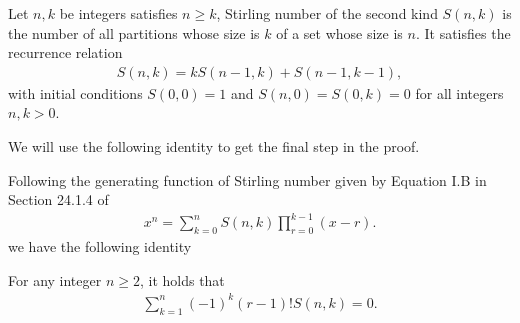 \documentclass[letterpaper,11pt]{article}
\newcommand{\uset}{\calU}
\newcommand{\usetp}[2]{\uset(#1,#2)}
\newcommand{\vset}{\calV}
\newcommand{\vsetp}[2]{\vset(#1,#2)}
\newcommand{\ustat}{\mathbb{U}}
\newcommand{\vstat}{\mathbb{V}}
\newcommand{\partition}{\mathrm{Partition}}
\newcommand{\partitionp}[1]{\partition(#1)}
\newcommand{\pgreater}{\succ}
\begin{document}





\begin{definition}
\label{def:stirling_number}
    Let $n,k$ be integers satisfies $n \geq k$, Stirling number of the second kind $S(n, k)$ is the number of all partitions whose size is $k$ of a set whose size is $n$. It satisfies the recurrence relation 
    \begin{align*}
        S(n, k) = k S(n-1, k) + S(n-1, k-1),
    \end{align*}
    with initial conditions $S(0, 0) = 1$ and $S(n, 0) = S(0, k) = 0$ for all integers $n, k > 0$.
\end{definition}

We will use the following identity to get the final step in the proof. 

Following the generating function of Stirling number given by Equation I.B in Section 24.1.4 of \cite{abramowitz1948handbook}
\begin{align*}
    x^n = \sum_{k=0}^{n} S(n, k) \prod_{r=0}^{k-1} (x-r).
\end{align*}
we have the following identity
\begin{lemma}
    \label{lem:stirling_identity}
    For any integer $n \geq 2$, it holds that
    \begin{align*}
        \sum_{k=1}^{n} (-1)^k (r-1)! S(n, k) = 0.
    \end{align*}
\end{lemma}
\end{document}
